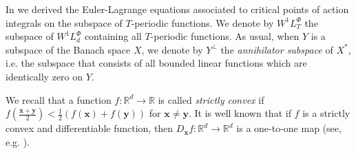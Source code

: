 \documentclass[twoside]{article}
\theoremstyle{remark}
\newcommand{\lphi}{L^{\Phi}}
\newcommand{\wphi}{W^{1}\lphi}
\renewcommand{\b}[1]{\boldsymbol{#1}}
\newcommand{\epsi}{E^{\Psi}}
\begin{document}
%




In \cite{ABGMS2015} we derived the Euler-Lagrange equations associated to critical points of action integrals on the subspace of $T$-periodic functions.  
We denote by $\wphi_T$ the subspace of $\wphi_d$ containing all  $T$-periodic functions. As usual, when $Y$ is a subspace of
the Banach space $X$, we denote by $Y^{\perp}$ the \emph{annihilator subspace} of $X^*$, i.e. the subspace
that consists of all  bounded linear functions which are identically zero on $Y$.

We recall that  a function $f: \mathbb{R}^d \to \mathbb{R}$ is called \emph{strictly convex} if 
$f\left(\tfrac{\b{x}+\b{y}}{2}\right)< \tfrac{1}{2} \left(f\left(
\b{x}\right)+f\left( \b{y}\right)\right)$ for  $\b{x}\neq\b{y}$.  
It is  well known that if $f$ is a strictly convex and differentiable function, then
$D_{\b{x}}f:\mathbb{R}^d\to\mathbb{R}^d$ is a one-to-one map  (see, e.g. \cite[Thm. 12.17]{rockafellar2009variational}).
\end{document}
